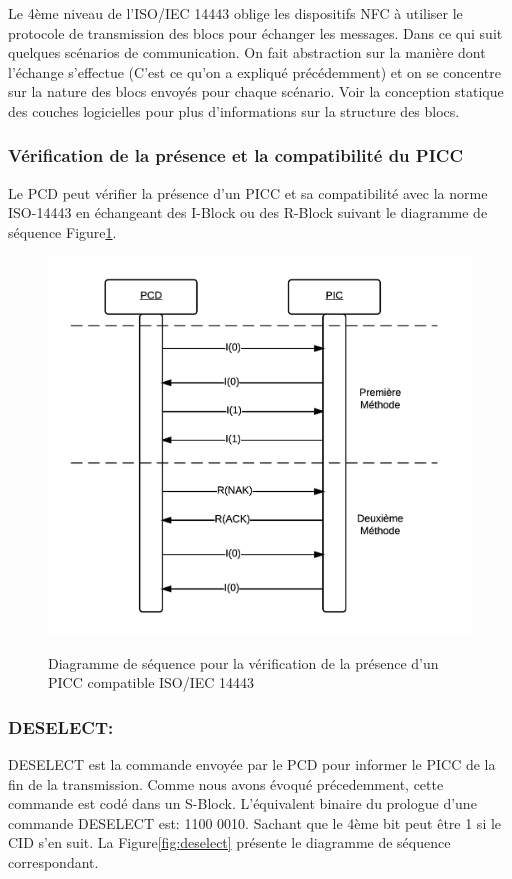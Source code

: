 \documentclass{themeensg}
\begin{document}
Le 4ème niveau de l'ISO/IEC 14443 oblige les dispositifs NFC à utiliser le protocole de transmission des blocs pour échanger les messages. Dans ce qui suit quelques scénarios de communication. On fait abstraction sur la manière dont l'échange s'effectue (C'est ce qu'on a expliqué précédemment) et on se concentre sur la nature des blocs envoyés pour chaque scénario. Voir la conception statique des couches logicielles pour plus d'informations sur la structure des blocs.

\subsubsection{Vérification de la présence et la compatibilité du PICC}
Le PCD peut vérifier la présence d'un PICC et sa compatibilité avec la norme ISO-14443 en échangeant des I-Block ou des R-Block suivant le diagramme de séquence Figure\ref{fig:presencecheck}.

\begin{figure}[h!]
\centering
\includegraphics[scale=0.9]{images/presencecheck.png}
\label{fig:presencecheck}
\caption{Diagramme de séquence pour la vérification de la présence d'un PICC compatible ISO/IEC 14443}
\end{figure}

\subsubsection{DESELECT:}
DESELECT est la commande envoyée par le PCD pour informer le PICC de la fin de la transmission. Comme nous avons évoqué précedemment, cette commande est codé dans un S-Block. L'équivalent binaire du prologue d'une commande DESELECT est: 1100 0010. Sachant que le 4ème bit peut être 1 si le CID s'en suit. La Figure\ref{fig:deselect} présente le diagramme de séquence correspondant.
\end{document}
